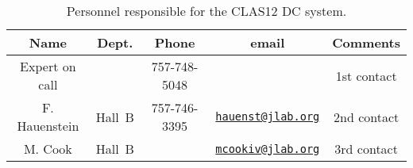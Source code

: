 \begin{table}[!htb]
\centering
\begin{tabular}{|c|c|c|c|c|} \hline
Name               & Dept.  & Phone        & email&Comments \\ \hline
Expert on call     &        & 757-748-5048 &       & 1st contact \\ \hline
F. Hauenstein & Hall~B & 757-746-3395 & \href{mailto:hauenst@jlab.org}{\nolinkurl{hauenst@jlab.org}} &  2nd contact\\ \hline
M. Cook        & Hall~B &              & \href{mailto:mcookiv@jlab.org}{\nolinkurl{mcookiv@jlab.org}} & 3rd contact\\ \hline

 \end{tabular}
\caption{Personnel responsible for the CLAS12 DC system.} 
\label{tb:dc}
\end{table}
